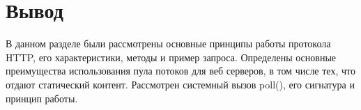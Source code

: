 \section*{Вывод}
В данном разделе были рассмотрены основные принципы работы протокола HTTP, его характеристики, методы 
и пример запроса. Определены основные преимущества использования пула потоков для 
веб серверов, в том числе тех, что отдают статический контент. Рассмотрен системный 
вызов poll(), его сигнатура и принцип работы.
